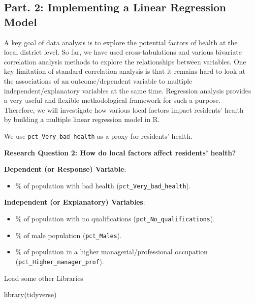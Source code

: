 \documentclass[
  letterpaper,
  DIV=11,
  numbers=noendperiod]{scrreprt}
\newenvironment{Shaded}{\begin{snugshade}}{\end{snugshade}}
\newcommand{\FunctionTok}[1]{\textcolor[rgb]{0.28,0.35,0.67}{#1}}
\newcommand{\NormalTok}[1]{\textcolor[rgb]{0.00,0.23,0.31}{#1}}
\providecommand{\tightlist}{%
  \setlength{\itemsep}{0pt}\setlength{\parskip}{0pt}}\usepackage{longtable,booktabs,array}
\begin{document}
\subsection{Part. 2: Implementing a Linear Regression
Model}\label{part.-2-implementing-a-linear-regression-model}

A key goal of data analysis is to explore the potential factors of
health at the local district level. So far, we have used
cross-tabulations and various bivariate correlation analysis methods to
explore the relationships between variables. One key limitation of
standard correlation analysis is that it remains hard to look at the
associations of an outcome/dependent variable to multiple
independent/explanatory variables at the same time. Regression analysis
provides a very useful and flexible methodological framework for such a
purpose. Therefore, we will investigate how various local factors impact
residents' health by building a multiple linear regression model in R.

We use \texttt{pct\_Very\_bad\_health} as a proxy for residents' health.

\textbf{Research Question 2: How do local factors affect residents'
health?}

\textbf{Dependent (or Response) Variable}:

\begin{itemize}
\tightlist
\item
  \% of population with bad health (\texttt{pct\_Very\_bad\_health}).
\end{itemize}

\textbf{Independent (or Explanatory) Variables}:

\begin{itemize}
\tightlist
\item
  \% of population with no qualifications
  (\texttt{pct\_No\_qualifications}).
\item
  \% of male population (\texttt{pct\_Males}).
\item
  \% of population in a higher managerial/professional occupation
  (\texttt{pct\_Higher\_manager\_prof}).
\end{itemize}

Load some other Libraries

\begin{Shaded}
\begin{Highlighting}[]
\FunctionTok{library}\NormalTok{(tidyverse)}
\end{Highlighting}
\end{Shaded}
\end{document}
